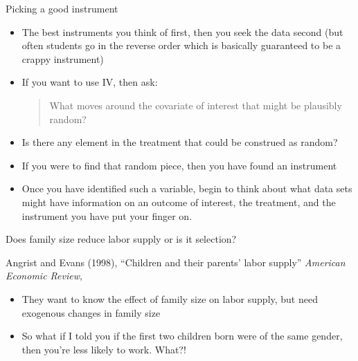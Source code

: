 \documentclass{beamer}
\begin{document}
\begin{frame}{Picking a good instrument}

	\begin{itemize}
	\item The best instruments you think of first, then you seek the data second (but often students go in the reverse order which is basically guaranteed to be a crappy instrument)
	\item If you want to use IV, then ask: 
		\begin{quote}
		What moves around the covariate of interest that might be plausibly random?
		\end{quote}
		\item Is there any element in the treatment that could be construed as random?  
		\item If you were to find that random piece, then you have found an instrument
	\item Once you have identified such a variable, begin to think about what data sets might have information on an outcome of interest, the treatment, and the instrument you have put your finger on.
	\end{itemize}
\end{frame}



\begin{frame}{Does family size reduce labor supply or is it selection?}

Angrist and Evans (1998), ``Children and their parents' labor supply'' \emph{American Economic Review}, 
		\begin{itemize}
		\item They want to know the effect of family size on labor supply, but need exogenous changes in family size
		\item So what if I told you if the first two children born were of the same gender, then you're less likely to work. What?!
		\end{itemize}

\end{frame}
\end{document}
